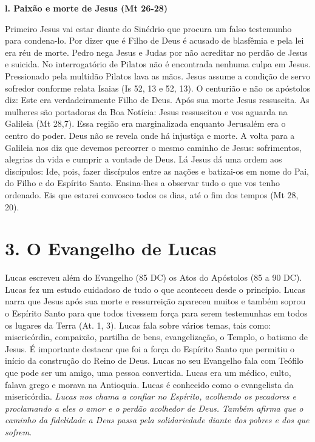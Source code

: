 \documentclass[
]{book}
\begin{document}
\textbf{l. Paixão e morte de Jesus (Mt 26-28)}

Primeiro Jesus vai estar diante do Sinédrio que procura um falso testemunho para condena-lo. Por dizer que é Filho de Deus é acusado de blasfêmia e pela lei era réu de morte. Pedro nega Jesus e Judas por não acreditar no perdão de Jesus e suicida. No interrogatório de Pilatos não é encontrada nenhuma culpa em Jesus. Pressionado pela multidão Pilatos lava as mãos. Jesus assume a condição de servo sofredor conforme relata Isaias (Is 52, 13 e 52, 13). O centurião e não os apóstolos diz: Este era verdadeiramente Filho de Deus. Após sua morte Jesus ressuscita. As mulheres são portadoras da Boa Notícia: Jesus ressuscitou e vos aguarda na Galileia (Mt 28,7). Essa região era marginalizada enquanto Jerusalém era o centro do poder. Deus não se revela onde há injustiça e morte. A volta para a Galileia nos diz que devemos percorrer o mesmo caminho de Jesus: sofrimentos, alegrias da vida e cumprir a vontade de Deus. Lá Jesus dá uma ordem aos discípulos: Ide, pois, fazer discípulos entre as nações e batizai-os em nome do Pai, do Filho e do Espírito Santo. Ensina-lhes a observar tudo o que vos tenho ordenado. Eis que estarei convosco todos os dias, até o fim dos tempos (Mt 28, 20).

\hypertarget{o-evangelho-de-lucas}{%
\section*{3. O Evangelho de Lucas}\label{o-evangelho-de-lucas}}

Lucas escreveu além do Evangelho (85 DC) os Atos do Apóstolos (85 a 90 DC). Lucas fez um estudo cuidadoso de tudo o que aconteceu desde o princípio. Lucas narra que Jesus após sua morte e ressurreição apareceu muitos e também soprou o Espírito Santo para que todos tivessem força para serem testemunhas em todos os lugares da Terra (At. 1, 3). Lucas fala sobre vários temas, tais como: misericórdia, compaixão, partilha de bens, evangelização, o Templo, o batismo de Jesus. É importante destacar que foi a força do Espírito Santo que permitiu o início da construção do Reino de Deus. Lucas no seu Evangelho fala com Teófilo que pode ser um amigo, uma pessoa convertida. Lucas era um médico, culto, falava grego e morava na Antioquia. Lucas é conhecido como o evangelista da misericórdia. \emph{Lucas nos chama a confiar no Espírito, acolhendo os pecadores e proclamando a eles o amor e o perdão acolhedor de Deus. Também afirma que o caminho da fidelidade a Deus passa pela solidariedade diante dos pobres e dos que sofrem}.
\end{document}

